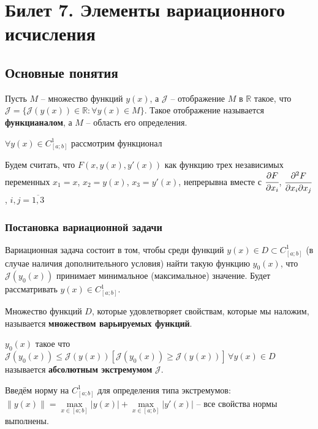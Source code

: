 \section{Билет 7. Элементы вариационного исчисления}
\subsection{Основные понятия}
\begin{definition}
    Пусть $M$ -- множество функций $y(x)$, а $\mathcal{J}$ -- отображение $M$ в $\mathbb{R}$ такое, что $\mathcal{J} = \{ \mathcal{J}(y(x)) \in \mathbb{R}: \forall y(x) \in M \}$. 
    Такое отображение называется \textbf{функцианалом}, а $M$ -- область его определения. 
\end{definition}

$\forall y(x) \in C^1_{[a;b]}$ рассмотрим функционал 

Будем считать, что $F(x, y(x), y'(x))$ как функцию трех независимых переменных $x_1 = x$, $x_2 = y(x)$, $x_3 = y'(x)$, непрерывна вместе с $\cfrac{\partial{F}}{\partial{x_i}}$,  $\cfrac{\partial^2{F}}{\partial{x_i}\partial{x_j}}$, $i,j = \overline{1, 3}$ 

\subsubsection*{Постановка вариационной задачи}

Вариационная задача состоит в том, чтобы среди функций $y(x) \in D \subset C^1_{[a;b]}$ (в случае наличия дополнительного условия) найти такую функцию $y_0(x)$, что $\mathcal{J}(y_0(x))$ принимает минимальное (максимальное) значение. Будет рассматривать $y(x) \in C^1_{[a;b]}$.

\begin{definition}
    Множество функций $D$, которые удовлетворяет свойствам, которые мы наложим, называется \textbf{множеством варьируемых функций}.
\end{definition}

\begin{definition}
    $y_0(x)$ такое что $\mathcal{J}(y_0(x)) \leq \mathcal{J}(y(x)) [\mathcal{J}(y_0(x)) \geq \mathcal{J}(y(x))] \, \forall y(x) \in D$ называется \textbf{абсолютным экстремумом} $\mathcal{J}$.  
\end{definition}

Введём норму на $C^1_{[a;b]}$ для определения типа экстремумов: $\| y(x) \| = \max \limits_{x \in [a;b]} |y(x)| + \max \limits_{x \in [a;b]} |y'(x)|$ -- все свойства нормы выполнены.

